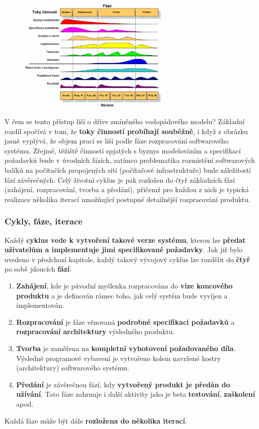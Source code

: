\begin{figure}[H]
\centering
\includegraphics[width=0.65\textwidth]{assets/rup.png}
\end{figure}

V čem se tento přístup liší o dříve zmíněného vodopádového modelu?  Základní rozdíl spočívá v tom, že \textbf{toky činností probíhají souběžně}, i když z obrázku jasně vyplývá, že objem prací se liší podle fáze rozpracování softwarového systému.  Zřejmě, těžiště činností spjatých s byznys modelováním a specifikací požadavků bude v úvodních fázích, zatímco problematika rozmístění softwarových balíků na počítačích propojených sítí (počítačové infrastruktuře) bude záležitostí fází závěrečných.  Celý životní cyklus je pak rozložen do čtyř základních fází (zahájení, rozpracování, tvorba a předání), přičemž pro každou z nich je typická realizace několika iterací umožňující postupné detailnější rozpracování produktu.


\subsubsection{Cykly, fáze, iterace}
Každý \textbf{cyklus vede k vytvoření takové verze systému}, kterou lze \textbf{předat uživatelům a implementuje jimi specifikované požadavky}. Jak již bylo uvedeno v předchozí kapitole, každý takový vývojový cyklus lze rozdělit do \textbf{čtyř} po sobě jdoucích \textbf{fází}: 
\begin{enumerate}
\item \textbf{Zahájení}, kde je původní myšlenka rozpracována do \textbf{vize koncového produktu} a je definován rámec toho, jak celý systém bude vyvíjen a implementován. 
\item \textbf{Rozpracování} je fáze věnovaná \textbf{podrobné specifikaci požadavků} a \textbf{rozpracování architektury} výsledného produktu. 
\item \textbf{Tvorba} je zaměřena na \textbf{kompletní vyhotovení požadovaného díla}.  Výsledné  programové vybavení je vytvořeno kolem navržené kostry (architektury) softwarového systému. 
\item \textbf{Předání} je závěrečnou fází, kdy \textbf{vytvořený produkt je předán do užívání}. Tato fáze zahrnuje i další aktivity jako je beta \textbf{testování}, \textbf{zaškolení} apod. 
\end{enumerate}
Každá fáze může být dále \textbf{rozložena do několika iterací}.

